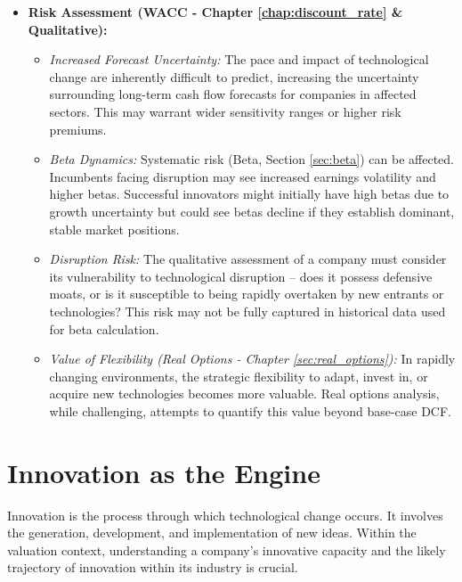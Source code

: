 \begin{itemize}
    \item \textbf{Risk Assessment (WACC - Chapter \ref{chap:discount_rate} \& Qualitative):}
          \begin{itemize}
              \item \textit{Increased Forecast Uncertainty:} The pace and impact of technological change are inherently difficult to predict, increasing the uncertainty surrounding long-term cash flow forecasts for companies in affected sectors. This may warrant wider sensitivity ranges or higher risk premiums.
              \item \textit{Beta Dynamics:} Systematic risk (Beta, Section \ref{sec:beta}) can be affected. Incumbents facing disruption may see increased earnings volatility and higher betas. Successful innovators might initially have high betas due to growth uncertainty but could see betas decline if they establish dominant, stable market positions.
              \item \textit{Disruption Risk:} The qualitative assessment of a company must consider its vulnerability to technological disruption – does it possess defensive moats, or is it susceptible to being rapidly overtaken by new entrants or technologies? This risk may not be fully captured in historical data used for beta calculation.
              \item \textit{Value of Flexibility (Real Options - Chapter \ref{sec:real_options}):} In rapidly changing environments, the strategic flexibility to adapt, invest in, or acquire new technologies becomes more valuable. Real options analysis, while challenging, attempts to quantify this value beyond base-case DCF.
          \end{itemize}
\end{itemize}

\section{Innovation as the Engine}
\label{sec:innovation}

Innovation is the process through which technological change occurs. It involves the generation, development, and implementation of new ideas. Within the valuation context, understanding a company's innovative capacity and the likely trajectory of innovation within its industry is crucial.

